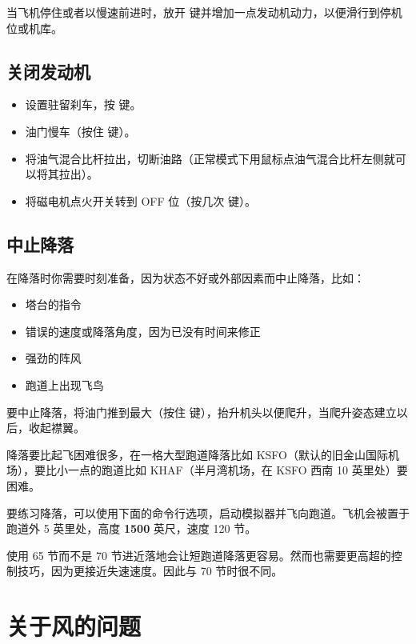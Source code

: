 当飞机停住或者以慢速前进时，放开  键并增加一点发动机动力，以便滑行到停机位或机库。

\subsection{关闭发动机}

\begin{itemize}
  \item 设置驻留刹车，按  键。
  \item 油门慢车（按住  键）。
  \item 将油气混合比杆拉出，切断油路（正常模式下用鼠标点油气混合比杆左侧就可以将其拉出）。
  \item 将磁电机点火开关转到 OFF 位（按几次 \key{\{} 键）。
\end{itemize}

\subsection{中止降落}

在降落时你需要时刻准备，因为状态不好或外部因素而中止降落，比如：

\begin{itemize}
  \item 塔台的指令
  \item 错误的速度或降落角度，因为已没有时间来修正
  \item 强劲的阵风
  \item 跑道上出现飞鸟
\end{itemize}

要中止降落，将油门推到最大（按住  键），抬升机头以便爬升，当爬升姿态建立以后，收起襟翼。

降落要比起飞困难很多，在一格大型跑道降落比如 KSFO（默认的旧金山国际机场），要比小一点的跑道比如 KHAF（半月湾机场，在 KSFO 西南 10 英里处）要困难。

要练习降落，可以使用下面的命令行选项，启动模拟器并飞向跑道。飞机会被置于跑道外 5 英里处，高度 \textbf{1500} 英尺，速度 120 节。


使用 65 节而不是 70 节进近落地会让短跑道降落更容易。然而也需要更高超的控制技巧，因为更接近失速速度。因此与 70 节时很不同。

\section{关于风的问题}
\label{sec:Fwsw}

